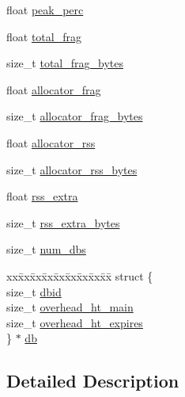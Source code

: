 \begin{DoxyCompactItemize}
\item 
float \hyperlink{structredis_mem_overhead_ab748e7839b4db27ca41f802fb4deb3e1}{peak\+\_\+perc}
\item 
float \hyperlink{structredis_mem_overhead_ac8bdd246c25c91aa5ae7af8362ff9188}{total\+\_\+frag}
\item 
size\+\_\+t \hyperlink{structredis_mem_overhead_a5e5705378e7ceb2bcfa33b637a7a6fd2}{total\+\_\+frag\+\_\+bytes}
\item 
float \hyperlink{structredis_mem_overhead_a6191ede96ce40757b7eb73d4bcc597f0}{allocator\+\_\+frag}
\item 
size\+\_\+t \hyperlink{structredis_mem_overhead_a7dcfd2bdf329730a992f30f52b145dbb}{allocator\+\_\+frag\+\_\+bytes}
\item 
float \hyperlink{structredis_mem_overhead_a213b026c5bb4a2421289b34e620eb4ef}{allocator\+\_\+rss}
\item 
size\+\_\+t \hyperlink{structredis_mem_overhead_a988880d896f03571a137a828ef96531a}{allocator\+\_\+rss\+\_\+bytes}
\item 
float \hyperlink{structredis_mem_overhead_ae1d7b7b42904d9ebb1698ab3ac79a2e9}{rss\+\_\+extra}
\item 
size\+\_\+t \hyperlink{structredis_mem_overhead_a9cafe99c292b52f795f9ceef838f4249}{rss\+\_\+extra\+\_\+bytes}
\item 
size\+\_\+t \hyperlink{structredis_mem_overhead_a5fff22cf574851b502f713e7db2980fe}{num\+\_\+dbs}
\item 
\begin{tabbing}
xx\=xx\=xx\=xx\=xx\=xx\=xx\=xx\=xx\=\kill
struct \{\\
\>size\_t \hyperlink{structredis_mem_overhead_a8379ee7de31460d30fac72e27c81fd7a}{dbid}\\
\>size\_t \hyperlink{structredis_mem_overhead_a1a15c326f9a9953cd14a0ba78aaea439}{overhead\_ht\_main}\\
\>size\_t \hyperlink{structredis_mem_overhead_a26a9170a61aa6eb593f9e57a2396a706}{overhead\_ht\_expires}\\
\} $\ast$ \hyperlink{structredis_mem_overhead_a92e2261ab8290fdc2955b81e5901203d}{db}\\

\end{tabbing}\end{DoxyCompactItemize}


\subsection{Detailed Description}



